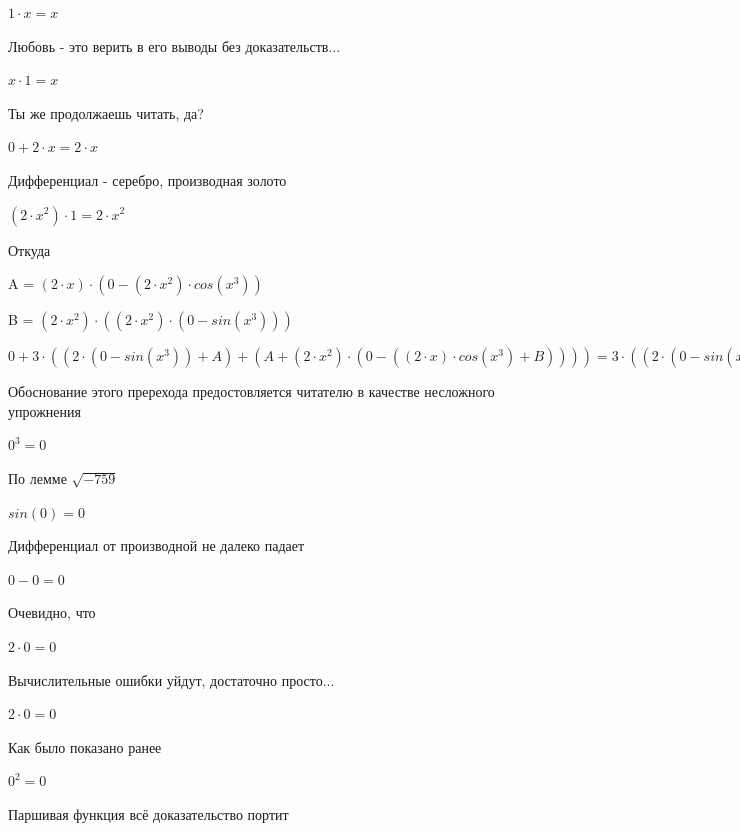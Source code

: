 \documentclass[12pt,a4paper,fleqn]{article}
\begin{document}
\begin{center}
$1 \cdot x = x$\end{center}
Любовь - это верить в его выводы без доказательств...

\begin{center}
$x \cdot 1 = x$\end{center}
Ты же продолжаешь читать, да?

\begin{center}
$0+2 \cdot x = 2 \cdot x$\end{center}
Дифференциал - серебро, производная золото\cite{link2}

\begin{center}
$(2 \cdot x^{2}) \cdot 1 = 2 \cdot x^{2}$\end{center}
Откуда

\begin{center}
A = $(2 \cdot x) \cdot (0-(2 \cdot x^{2}) \cdot cos(x^{3}))$\end{center}
\begin{center}
B = $(2 \cdot x^{2}) \cdot ((2 \cdot x^{2}) \cdot (0-sin(x^{3})))$\end{center}
\begin{center}
$0+3 \cdot ((2 \cdot (0-sin(x^{3}))+A)+(A+(2 \cdot x^{2}) \cdot (0-((2 \cdot x) \cdot cos(x^{3})+B)))) = 3 \cdot ((2 \cdot (0-sin(x^{3}))+A)+(A+(2 \cdot x^{2}) \cdot (0-((2 \cdot x) \cdot cos(x^{3})+B))))$\end{center}
Обоснование этого пререхода предостовляется читателю в качестве несложного упрожнения

\begin{center}$0^{3} = 0$\end{center}
По лемме $\sqrt{-759}$
\begin{center}$sin(0) = 0$\end{center}
Дифференциал от производной не далеко падает\cite{link2}

\begin{center}$0-0 = 0$\end{center}
Очевидно, что

\begin{center}$2 \cdot 0 = 0$\end{center}
Вычислительные ошибки уйдут, достаточно просто...

\begin{center}$2 \cdot 0 = 0$\end{center}
Как было показано ранее

\begin{center}$0^{2} = 0$\end{center}
Паршивая функция всё доказательство портит\cite{link2}
\end{document}
